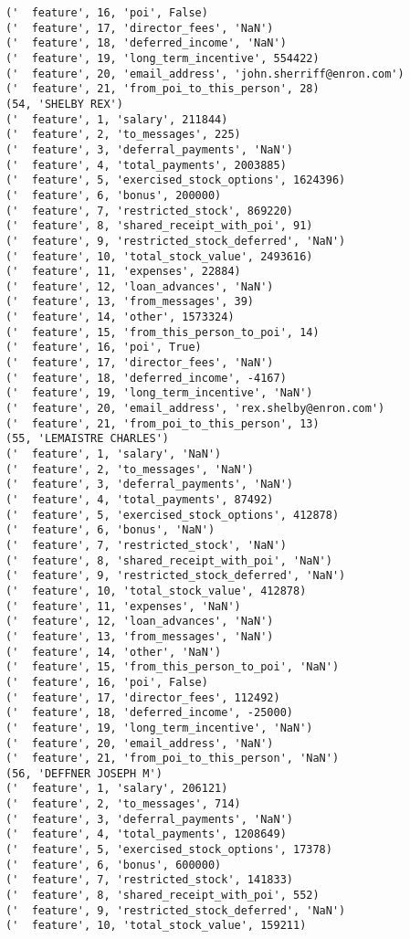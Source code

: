 \begin{verbatim}
('  feature', 16, 'poi', False)
('  feature', 17, 'director_fees', 'NaN')
('  feature', 18, 'deferred_income', 'NaN')
('  feature', 19, 'long_term_incentive', 554422)
('  feature', 20, 'email_address', 'john.sherriff@enron.com')
('  feature', 21, 'from_poi_to_this_person', 28)
(54, 'SHELBY REX')
('  feature', 1, 'salary', 211844)
('  feature', 2, 'to_messages', 225)
('  feature', 3, 'deferral_payments', 'NaN')
('  feature', 4, 'total_payments', 2003885)
('  feature', 5, 'exercised_stock_options', 1624396)
('  feature', 6, 'bonus', 200000)
('  feature', 7, 'restricted_stock', 869220)
('  feature', 8, 'shared_receipt_with_poi', 91)
('  feature', 9, 'restricted_stock_deferred', 'NaN')
('  feature', 10, 'total_stock_value', 2493616)
('  feature', 11, 'expenses', 22884)
('  feature', 12, 'loan_advances', 'NaN')
('  feature', 13, 'from_messages', 39)
('  feature', 14, 'other', 1573324)
('  feature', 15, 'from_this_person_to_poi', 14)
('  feature', 16, 'poi', True)
('  feature', 17, 'director_fees', 'NaN')
('  feature', 18, 'deferred_income', -4167)
('  feature', 19, 'long_term_incentive', 'NaN')
('  feature', 20, 'email_address', 'rex.shelby@enron.com')
('  feature', 21, 'from_poi_to_this_person', 13)
(55, 'LEMAISTRE CHARLES')
('  feature', 1, 'salary', 'NaN')
('  feature', 2, 'to_messages', 'NaN')
('  feature', 3, 'deferral_payments', 'NaN')
('  feature', 4, 'total_payments', 87492)
('  feature', 5, 'exercised_stock_options', 412878)
('  feature', 6, 'bonus', 'NaN')
('  feature', 7, 'restricted_stock', 'NaN')
('  feature', 8, 'shared_receipt_with_poi', 'NaN')
('  feature', 9, 'restricted_stock_deferred', 'NaN')
('  feature', 10, 'total_stock_value', 412878)
('  feature', 11, 'expenses', 'NaN')
('  feature', 12, 'loan_advances', 'NaN')
('  feature', 13, 'from_messages', 'NaN')
('  feature', 14, 'other', 'NaN')
('  feature', 15, 'from_this_person_to_poi', 'NaN')
('  feature', 16, 'poi', False)
('  feature', 17, 'director_fees', 112492)
('  feature', 18, 'deferred_income', -25000)
('  feature', 19, 'long_term_incentive', 'NaN')
('  feature', 20, 'email_address', 'NaN')
('  feature', 21, 'from_poi_to_this_person', 'NaN')
(56, 'DEFFNER JOSEPH M')
('  feature', 1, 'salary', 206121)
('  feature', 2, 'to_messages', 714)
('  feature', 3, 'deferral_payments', 'NaN')
('  feature', 4, 'total_payments', 1208649)
('  feature', 5, 'exercised_stock_options', 17378)
('  feature', 6, 'bonus', 600000)
('  feature', 7, 'restricted_stock', 141833)
('  feature', 8, 'shared_receipt_with_poi', 552)
('  feature', 9, 'restricted_stock_deferred', 'NaN')
('  feature', 10, 'total_stock_value', 159211)

\end{verbatim}
